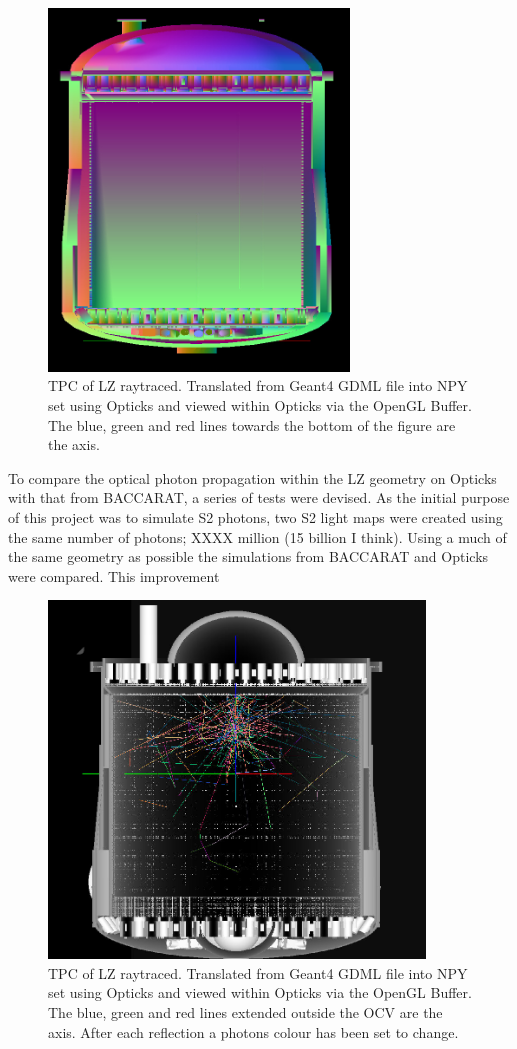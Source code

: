 \begin{figure}[!htbp]
\includegraphics[width=8cm]{Figures/Simulations/LZ_In_Opticks.png}
\centering
\caption{TPC of LZ raytraced. Translated from Geant4 GDML file into NPY set using Opticks and viewed within Opticks via the OpenGL Buffer.
The blue, green and red lines towards the bottom of the figure are the axis.}
\label{fig:OpticksLZTPC}
\end{figure}

\par
To compare the optical photon propagation within the LZ geometry on Opticks with that from BACCARAT, a series of tests were devised.
As the initial purpose of this project was to simulate S2 photons, two S2 light maps were created using the same number of photons; XXXX million (15 billion I think).
Using a much of the same geometry as possible the simulations from BACCARAT and Opticks were compared.
This improvement 

\begin{figure}[!htbp]
\includegraphics[width=10cm]{Figures/Simulations/LZ_S1_photons_In_Opticks.png}
\centering
\caption{TPC of LZ raytraced. Translated from Geant4 GDML file into NPY set using Opticks and viewed within Opticks via the OpenGL Buffer.
The blue, green and red lines extended outside the OCV are the axis. After each reflection a photons colour has been set to change.}
\label{fig:OpticksLZTPC_S1_Photons}
\end{figure}

